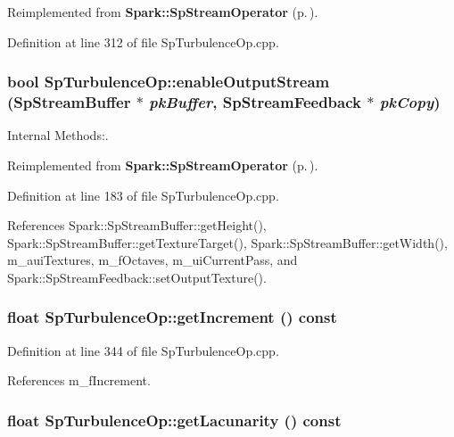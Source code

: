 Reimplemented from {\bf Spark::Sp\-Stream\-Operator} {\rm (p.\,\pageref{classSpark_1_1SpStreamOperator_b6})}.

Definition at line 312 of file Sp\-Turbulence\-Op.cpp.
\subsubsection{\setlength{\rightskip}{0pt plus 5cm}bool Sp\-Turbulence\-Op::enable\-Output\-Stream ({\bf Sp\-Stream\-Buffer} $\ast$ {\em pk\-Buffer}, {\bf Sp\-Stream\-Feedback} $\ast$ {\em pk\-Copy})\hspace{0.3cm}{\tt  [protected, virtual]}}\label{classSpark_1_1SpTurbulenceOp_b0}


Internal Methods:. 



Reimplemented from {\bf Spark::Sp\-Stream\-Operator} {\rm (p.\,\pageref{classSpark_1_1SpStreamOperator_b1})}.

Definition at line 183 of file Sp\-Turbulence\-Op.cpp.

References Spark::Sp\-Stream\-Buffer::get\-Height(), Spark::Sp\-Stream\-Buffer::get\-Texture\-Target(), Spark::Sp\-Stream\-Buffer::get\-Width(), m\_\-aui\-Textures, m\_\-f\-Octaves, m\_\-ui\-Current\-Pass, and Spark::Sp\-Stream\-Feedback::set\-Output\-Texture().
\subsubsection{\setlength{\rightskip}{0pt plus 5cm}float Sp\-Turbulence\-Op::get\-Increment () const}\label{classSpark_1_1SpTurbulenceOp_a10}


Definition at line 344 of file Sp\-Turbulence\-Op.cpp.

References m\_\-f\-Increment.
\subsubsection{\setlength{\rightskip}{0pt plus 5cm}float Sp\-Turbulence\-Op::get\-Lacunarity () const}\label{classSpark_1_1SpTurbulenceOp_a8}


